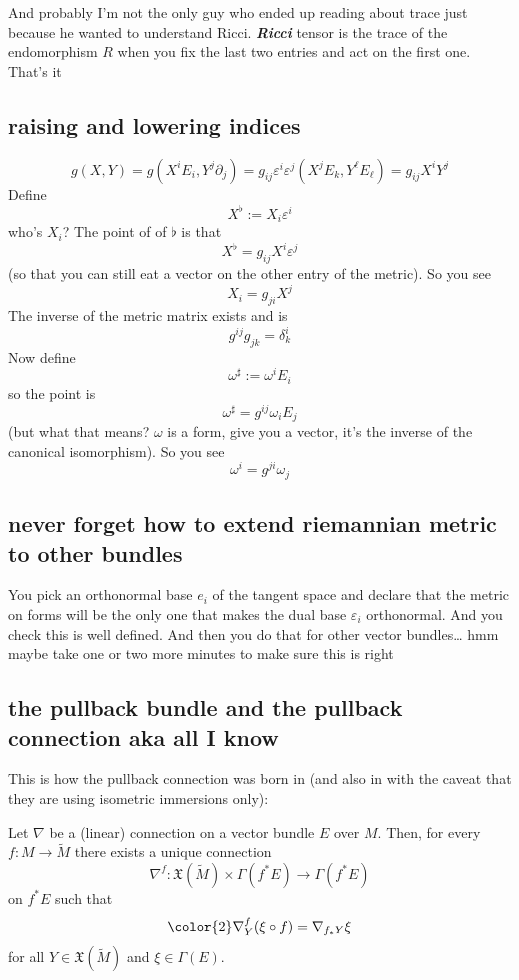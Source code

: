 And probably I'm not the only guy who ended up reading about trace just because he wanted to understand Ricci. \textit{\textbf{Ricci}} tensor is the trace of the endomorphism  \(R\) when you fix the last two entries and act on the first one. That's it

\subsection{raising and lowering indices}

\[g(X,Y)=g(X^iE_i,Y^j\partial_j)=g_{ij}\varepsilon^i\varepsilon^j(X^jE_k,Y^\ell E_\ell)=g_{ij}X^iY^j\]
Define
\[X^\flat:=X_i\varepsilon^i\]
who's \(X_i\)? The point of of \(\flat\) is that
\[X^\flat =g_{ij}X^i\varepsilon^j\]
(so that you can still eat a vector on the other entry of the metric). So you see
\[X_i=g_{ji}X^j\]
The inverse of the metric matrix exists and is
\[g^{ij}g_{j k}=\delta^i_k\]
Now define
\[\omega^\sharp:=\omega^iE_i\]
so the point is
\[\omega^\sharp=g^{ij}\omega_iE_j\]
(but what that means? \(\omega\) is a form, give you a vector, it's the inverse of the canonical isomorphism). So you see
\[\omega^i=g^{ji}\omega_j\]



\subsection{never forget how to extend riemannian metric to other bundles}

You pick an orthonormal base \(e_i\) of the tangent space and declare that the metric on forms will be the only one that makes the dual base \(\varepsilon_i\) orthonormal. And you check this is well defined. And then you do that for other vector bundles… hmm maybe take one or two more minutes to make sure this is right

\subsection{the pullback bundle and the pullback connection aka all I know}

This is how the pullback connection was born in \cite{au} (and also in \cite{daj} with the caveat that they are using isometric immersions only):

\begin{prop}\leavevmode
Let \(\nabla\) be a (linear) connection on a vector bundle \(E\) over \(M\). Then, for every \(f:M \to \widetilde{M}\) there exists a unique connection
\[\nabla^f:\mathfrak{X}(\widetilde{M}) \times \Gamma(f^*E) \longrightarrow \Gamma(f^*E)\]
on \(f^*E\) such that
\[{\color{2}\nabla^f_Y(\xi \circ f)=\nabla_{f_* Y}\xi}\]
for all \(Y \in \mathfrak{X}(\widetilde{M})\) and \(\xi \in \Gamma(E)\).
\end{prop}

